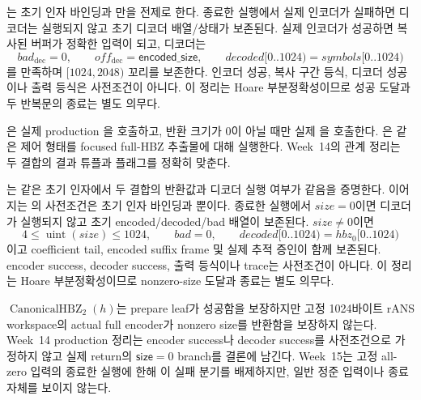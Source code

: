 \begin{verified}
\label{thm:rans-core-actual-inverse}
는 초기 인자 바인딩과
만을 전제로 한다. 종료한 실행에서 실제
인코더가 실패하면 디코더는 실행되지 않고 초기 디코더 배열/상태가 보존된다.
실제 인코더가 성공하면 복사된 버퍼가 정확한  입력이
되고, 디코더는
\[
  bad_{\mathrm{dec}}=0,\qquad
  off_{\mathrm{dec}}=\mathsf{encoded\_size},\qquad
  decoded[0..1024)=symbols[0..1024)
\]
를 만족하며 \([1024,2048)\) 꼬리를 보존한다. 인코더 성공, 복사 구간 등식,
디코더 성공이나 출력 등식은 사전조건이 아니다. 이 정리는 Hoare
부분정확성이므로 성공 도달과 두 반복문의 종료는 별도 의무다.
\end{verified}

\begin{definition}
\label{def:production-full-hbz-harness}
은 실제 production
을 호출하고, 반환
크기가 0이 아닐 때만 실제
을 호출한다.
은 같은 제어 형태를 focused full-HBZ
추출물에 대해 실행한다. Week~14의 관계 정리는 두 결합의 결과 튜플과
 플래그를 정확히 맞춘다.
\end{definition}

\begin{verified}
\label{thm:production-full-hbz-inverse}
는 같은 초기 인자에서
두 결합의 반환값과 디코더 실행 여부가 같음을 증명한다. 이어지는
의 사전조건은 초기
인자 바인딩과 뿐이다. 종료한 실행에서
\(size=0\)이면 디코더가 실행되지 않고 초기 encoded/decoded/bad 배열이
보존된다. \(size\ne0\)이면
\[
  4\le\operatorname{uint}(size)\le1024,
  \qquad bad=0,
  \qquad decoded[0..1024)=hbz_0[0..1024)
\]
이고 coefficient tail, encoded suffix frame 및 실제
 추적 증인이 함께 보존된다. encoder success,
decoder success, 출력 등식이나 trace는 사전조건이 아니다. 이 정리는 Hoare
부분정확성이므로 nonzero-size 도달과 종료는 별도 의무다.
\end{verified}

\begin{boundary}
\label{bdry:hbz-success}
\(\operatorname{CanonicalHBZ}_2(h)\)는 prepare leaf가 성공함을 보장하지만 고정
1024바이트 rANS workspace의 actual full encoder가 nonzero size를 반환함을
보장하지 않는다. Week~14 production 정리는 encoder success나 decoder success를
사전조건으로 가정하지 않고 실제 return의 \(\mathsf{size}=0\) branch를 결론에
남긴다. Week~15는 고정 all-zero 입력의 종료한 실행에 한해 이 실패 분기를
배제하지만, 일반 정준 입력이나 종료 자체를 보이지 않는다.
\end{boundary}

